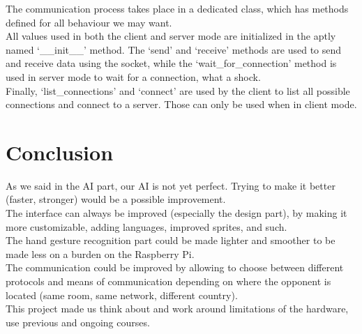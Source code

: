 \documentclass[11pt, a4paper, oneside]{report}
\begin{document}
	The communication process takes place in a dedicated class, which has methods defined for all behaviour we may want. \\
	All values used in both the client and server mode are initialized in the aptly named `\_\_init\_\_' method. The `send' and `receive' methods are used to send and receive data using the socket, while the `wait\_for\_connection' method is used in server mode to wait for a connection, what a shock. \\
	Finally, `list\_connections' and `connect' are used by the client to list all possible connections and connect to a server. Those can only be used when in client mode.
	
	\chapter{Conclusion}
	As we said in the AI part, our AI is not yet perfect. Trying to make it better (faster, stronger) would be a possible improvement. \\
	The interface can always be improved (especially the design part), by making it more customizable, adding languages, improved sprites, and such. \\
	The hand gesture recognition part could be made lighter and smoother to be made less on a burden on the Raspberry Pi. \\
	The communication could be improved by allowing to choose between different protocols and means of communication depending on where the opponent is located (same room, same network, different country). \\

	This project made us think about and work around limitations of the hardware, use previous and ongoing courses.
\end{document}
